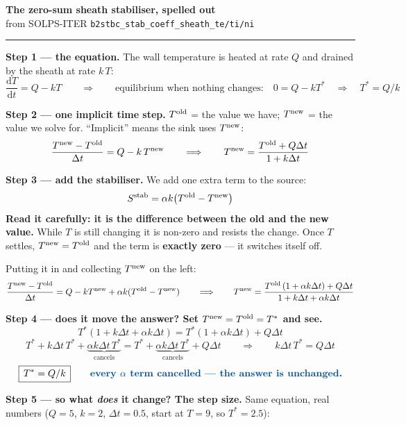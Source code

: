 \documentclass[11pt,a4paper]{article}
\newcommand{\code}[1]{\texttt{\small #1}}
\newcommand{\Told}{T^{\rm old}}
\newcommand{\Tnew}{T^{\rm new}}
\begin{document}
{\large\bfseries The zero-sum sheath stabiliser, spelled out}\\[1pt]
{\footnotesize from SOLPS-ITER \code{b2stbc\_stab\_coeff\_sheath\_te/ti/ni}}
\vspace{3pt}\hrule\vspace{6pt}

\textbf{Step 1 --- the equation.} The wall temperature is heated at rate $Q$ and drained by the
sheath at rate $k\,T$:
\[
\frac{\mathrm{d}T}{\mathrm{d}t}=Q-kT
\qquad\Longrightarrow\qquad
\text{equilibrium when nothing changes:}\quad 0=Q-kT^{*}\quad\Rightarrow\quad \boxed{T^{*}=Q/k}
\]

\textbf{Step 2 --- one implicit time step.} $\Told$ = the value we have; $\Tnew$ = the value we
solve for. ``Implicit'' means the sink uses $\Tnew$:
\[
\frac{\Tnew-\Told}{\Delta t}=Q-k\,\Tnew
\qquad\Longrightarrow\qquad
\Tnew=\frac{\Told+Q\Delta t}{1+k\Delta t}
\]

\textbf{Step 3 --- add the stabiliser.} We add one extra term to the source:
\[
S^{\rm stab}=\alpha k\bigl(\Told-\Tnew\bigr)
\]
\textcolor{hl}{\textbf{Read it carefully: it is the difference between the old and the new value.}}
While $T$ is still changing it is non-zero and resists the change. Once $T$ settles,
$\Tnew=\Told$ and the term is \textbf{exactly zero} --- it switches itself off.

\vspace{3pt}
Putting it in and collecting $\Tnew$ on the left:
\[
\frac{\Tnew-\Told}{\Delta t}=Q-k\Tnew+\alpha k(\Told-\Tnew)
\qquad\Longrightarrow\qquad
\Tnew=\frac{\Told\,(1+\alpha k\Delta t)+Q\Delta t}{1+k\Delta t+\alpha k\Delta t}
\]

\begin{tcolorbox}[colback=blue!3,colframe=hl!60,boxrule=0.6pt,left=6pt,right=6pt,top=4pt,bottom=4pt]
\textbf{Step 4 --- does it move the answer? Set $\Tnew=\Told=T^{*}$ and see.}
\[
T^{*}(1+k\Delta t+\alpha k\Delta t)=T^{*}(1+\alpha k\Delta t)+Q\Delta t
\]
\[
T^{*}+k\Delta t\,T^{*}+\underbrace{\alpha k\Delta t\,T^{*}}_{\text{cancels}}
= T^{*}+\underbrace{\alpha k\Delta t\,T^{*}}_{\text{cancels}}+Q\Delta t
\qquad\Longrightarrow\qquad
k\Delta t\,T^{*}=Q\Delta t
\]
\[
\boxed{\,T^{*}=Q/k\,}\qquad\textcolor{hl}{\textbf{every $\alpha$ term cancelled --- the answer is
unchanged.}}
\]
\end{tcolorbox}

\textbf{Step 5 --- so what \emph{does} it change? The step size.} Same equation, real numbers
($Q=5$, $k=2$, $\Delta t=0.5$, start at $T=9$, so $T^{*}=2.5$):
\end{document}
